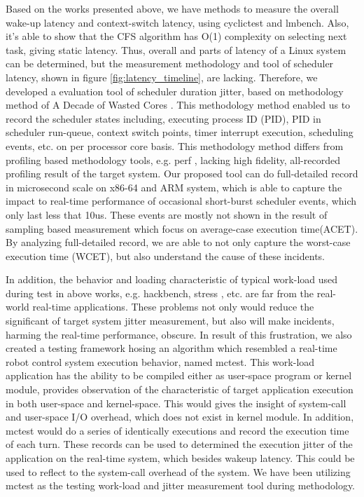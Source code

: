 \documentclass[conference]{IEEEtran}
\begin{document}
    Based on the works presented above, we have methods to measure the overall wake-up latency and context-switch
    latency, using cyclictest and lmbench. Also, it's able to show that the CFS algorithm has O(1) complexity on
    selecting next task, giving static latency. Thus, overall  and parts of latency of a Linux system can be determined,
    but the measurement methodology and tool of scheduler latency, shown in figure \ref{fig:latency_timeline}, are
    lacking. Therefore, we developed a evaluation tool of scheduler duration jitter, based on methodology method of A
    Decade of Wasted Cores \cite{Lozi:2016:LSD:2901318.2901326}. This methodology method enabled us to record the
    scheduler states including, executing process ID (PID), PID in scheduler run-queue, context switch points, timer
    interrupt execution, scheduling events, etc. on per processor core basis. This methodology method differs from
    profiling based methodology tools, e.g. perf \cite{perf}, lacking high fidelity, all-recorded profiling result of
    the target system. Our proposed tool can do full-detailed record in microsecond scale on x86-64 and ARM system,
    which is able to capture the impact to real-time performance of occasional short-burst scheduler events, which only
    last less that 10us. These events are mostly not shown in the result of sampling based measurement which focus on
    average-case execution time(ACET). By analyzing full-detailed record, we are able to not only capture the worst-case
    execution time (WCET), but also understand the cause of these incidents.

    In addition, the behavior and loading characteristic of typical work-load used during test in above works, e.g.
    hackbench, stress \cite{rt-tests}, etc. are far from the real-world real-time applications. These problems not only
    would reduce the significant of target system jitter measurement, but also will make incidents, harming the
    real-time performance, obscure. In result of this frustration, we also created a testing framework hosing an
    algorithm which resembled a real-time robot control system execution behavior, named mctest. This work-load
    application has the ability to be compiled either as user-space program or kernel module, provides observation of
    the characteristic of target application execution in both user-space and kernel-space. This would gives the insight
    of system-call and user-space I/O overhead, which does not exist in kernel module. In addition, mctest would do a
    series of identically executions and record the execution time of each turn. These records can be used to determined
    the execution jitter of the application on the real-time system, which besides wakeup latency. This could be used to
    reflect to the system-call overhead of the system. We have been utilizing mctest as the testing work-load and jitter
    measurement tool during methodology.
\end{document}
